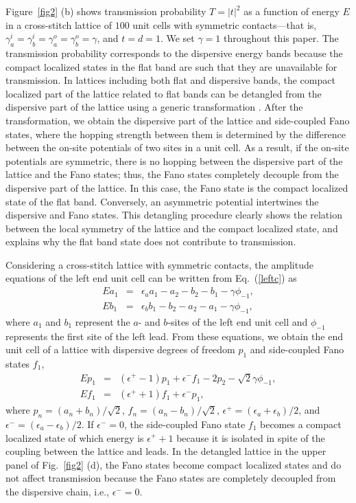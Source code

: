 \documentclass[twocolumn,showpacs,epsfig,pre]{revtex4}
\begin{document}
Figure~\ref{fig2} (b) shows transmission probability $T=\left|t\right|^2$ as a function of energy $E$ in a cross-stitch lattice of $100$ unit cells with symmetric contacts---that is, $\gamma_a^{i}=\gamma_b^{i}=\gamma_a^{o}=\gamma_b^{o}=\gamma$, and $t = d = 1$. We set $\gamma=1$ throughout this paper. The transmission probability corresponds to the dispersive energy bands because the compact localized states in the flat band are such that they are unavailable for transmission.
In lattices including both flat and dispersive bands, the compact localized part of the lattice related to flat bands can be detangled from the dispersive part of the lattice using a generic transformation \cite{Fla14}. After the transformation, we obtain the dispersive part of the lattice and side-coupled Fano states, where the hopping strength between them is determined by the difference between the on-site potentials of two sites in a unit cell. As a result, if the on-site potentials are symmetric, there is no hopping between the dispersive part of the lattice and the Fano states; thus, the Fano states completely decouple from the dispersive part of the lattice. In this case, the Fano state is the compact localized state of the flat band. Conversely, an asymmetric potential intertwines the dispersive and Fano states. This detangling procedure clearly shows the relation between the local symmetry of the lattice and the compact localized state, and explains why the flat band state does not contribute to transmission.

Considering a cross-stitch lattice with symmetric contacts, the amplitude equations of the left end unit cell can be written from Eq.~(\ref{leftc}) as
\begin{eqnarray}
E a_1 &=& \epsilon_a a_1 - a_2 - b_2 - b_1 -\gamma \phi_{-1}, \\\nonumber
E b_1 &=& \epsilon_b b_1 - b_2 - a_2 - a_1 -\gamma \phi_{-1},
\end{eqnarray}
where $a_1$ and $b_1$ represent the $a$- and $b$-sites of the left end unit cell and $\phi_{-1}$ represents the first site of the left lead. From these equations, we obtain the end unit cell of a lattice with dispersive degrees of freedom $p_1$ and side-coupled Fano states $f_1$,
\begin{eqnarray}
\label{fanoeq}
E p_1&=& (\epsilon^{+} - 1) p_1 + \epsilon^{-} f_1 - 2 p_2 - \sqrt{2} \gamma \phi_{-1}, \\\nonumber
E f_1 &=&  (\epsilon^{+} + 1) f_1 + \epsilon^{-} p_1,
\end{eqnarray}
where $p_n = (a_n + b_n)/\sqrt{2}$, $f_n = (a_n - b_n)/\sqrt{2}$, $\epsilon^{+} = (\epsilon_{a} + \epsilon_{b})/2$, and $\epsilon^{-} = (\epsilon_{a} - \epsilon_{b})/2$. If $\epsilon^{-} = 0$, the side-coupled Fano state $f_1$ becomes a compact localized state of which energy is $\epsilon^{+} +1$ because it is isolated in spite of the coupling between the lattice and leads. In the detangled lattice in the upper panel of Fig.~\ref{fig2} (d), the Fano states become compact localized states and do not affect transmission because the Fano states are completely decoupled from the dispersive chain, i.e., $\epsilon^{-} = 0$.
\end{document}
